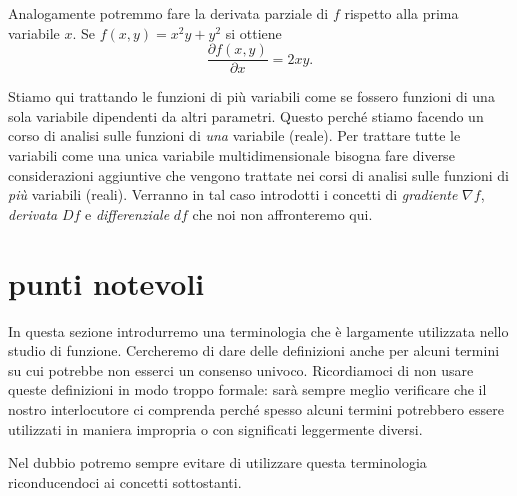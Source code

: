 Analogamente potremmo fare la derivata parziale di $f$ rispetto alla prima 
variabile $x$. Se $f(x,y) = x^2y+y^2$ si ottiene
\[
\frac{\partial f(x,y)}{\partial x} = 2xy.
\]

Stiamo qui trattando le funzioni di più variabili come se fossero funzioni di una sola 
variabile dipendenti da altri parametri. 
Questo perché stiamo facendo un corso di analisi sulle funzioni di \emph{una} variabile (reale).
%
%
%
Per trattare tutte le variabili come una unica variabile multidimensionale 
bisogna fare diverse considerazioni 
aggiuntive che vengono trattate nei corsi di analisi sulle funzioni di 
\emph{più} 
%
%
%
variabili (reali). 
Verranno in tal caso introdotti i concetti di \emph{gradiente} $\nabla f$, 
\emph{derivata} $Df$ e \emph{differenziale} $df$ che noi non affronteremo qui.

\section{punti notevoli}

In questa sezione introdurremo una terminologia che è largamente utilizzata 
nello studio di funzione.
Cercheremo di dare delle definizioni anche per alcuni termini su cui potrebbe 
non esserci un consenso univoco.
Ricordiamoci di non usare queste definizioni in modo troppo formale:
sarà sempre meglio
verificare che il nostro interlocutore ci comprenda
perché spesso alcuni termini potrebbero essere utilizzati in maniera
impropria o con significati leggermente diversi.

Nel dubbio potremo sempre evitare di utilizzare questa terminologia 
riconducendoci ai concetti sottostanti.

